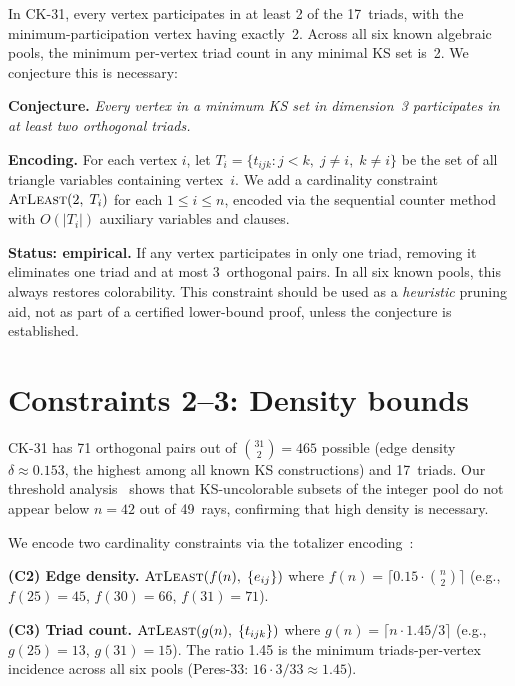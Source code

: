 \documentclass[twocolumn,prl,superscriptaddress,nofootinbib]{revtex4-2}
\begin{document}
In CK-31, every vertex participates in at least 2 of the 17~triads, with the minimum-participation vertex having exactly~2.  Across all six known algebraic pools, the minimum per-vertex triad count in any minimal KS set is~2.  We conjecture this is necessary:

\medskip
\noindent\textbf{Conjecture.}  \emph{Every vertex in a minimum KS set in dimension~3 participates in at least two orthogonal triads.}

\medskip
\noindent\textbf{Encoding.}  For each vertex $i$, let $T_i = \{t_{ijk} : j < k,\; j \neq i,\; k \neq i\}$ be the set of all triangle variables containing vertex~$i$.  We add a cardinality constraint $\textsc{AtLeast}(2,\; T_i)$ for each $1 \leq i \leq n$, encoded via the sequential counter method~\cite{BailleuxBoufkhad2003} with $O(|T_i|)$ auxiliary variables and clauses.

\medskip
\noindent\textbf{Status: empirical.}  If any vertex participates in only one triad, removing it eliminates one triad and at most 3~orthogonal pairs.  In all six known pools, this always restores colorability.  This constraint should be used as a \emph{heuristic} pruning aid, not as part of a certified lower-bound proof, unless the conjecture is established.

\section{Constraints 2--3: Density bounds}

CK-31 has 71 orthogonal pairs out of $\binom{31}{2} = 465$ possible (edge density $\delta \approx 0.153$, the highest among all known KS constructions) and 17~triads.  Our threshold analysis~\cite{Kernaghan2026sub31} shows that KS-uncolorable subsets of the integer pool do not appear below $n = 42$ out of 49~rays, confirming that high density is necessary.

We encode two cardinality constraints via the totalizer encoding~\cite{BailleuxBoufkhad2003}:

\noindent\textbf{(C2) Edge density.}
$\textsc{AtLeast}(f(n),\; \{e_{ij}\})$
where $f(n) = \lceil 0.15 \cdot \binom{n}{2} \rceil$ (e.g., $f(25) = 45$, $f(30) = 66$, $f(31) = 71$).

\noindent\textbf{(C3) Triad count.}
$\textsc{AtLeast}(g(n),\; \{t_{ijk}\})$
where $g(n) = \lceil n \cdot 1.45/3 \rceil$ (e.g., $g(25) = 13$, $g(31) = 15$).  The ratio 1.45 is the minimum triads-per-vertex incidence across all six pools (Peres-33: $16 \cdot 3/33 \approx 1.45$).
\end{document}

